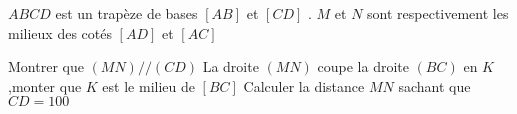 \documentclass[a4paper,addpoints,12pt]{exam}
\begin{document}
\begin{exo}[6]
$ABCD$ est un trapèze de bases $[AB]$ et $[CD]$ . $M$ et $N$ sont respectivement les milieux des cotés $[AD]$ et $[AC]$ 
\begin{questions}
\question[2] Montrer que $(MN)//(CD)$\newline
\anserline[3]
\question[2] La droite $(MN)$ coupe la droite $(BC)$ en $K$ ,monter que $K$ est le milieu de $[BC]$\newline
\anserline[3]
\question[2] Calculer la distance $MN$ sachant que $CD=100$\newline
\anserline[3]
\end{questions}
\end{exo}
\end{document}
